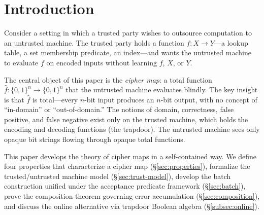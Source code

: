 \documentclass[11pt]{article}
\theoremstyle{definition}
\theoremstyle{plain}
\theoremstyle{remark}
\newcommand{\fhat}{\hat{f}}
\begin{document}
\section{Introduction}
\label{sec:intro}

Consider a setting in which a trusted party wishes to outsource computation
to an untrusted machine.  The trusted party holds a function
$f : X \to Y$---a lookup table, a set membership predicate, an index---and
wants the untrusted machine to evaluate $f$ on encoded inputs without
learning $f$, $X$, or $Y$.

The central object of this paper is the \emph{cipher map}: a total function
$\fhat : \{0,1\}^n \to \{0,1\}^n$ that the untrusted machine evaluates
blindly.  The key insight is that $\fhat$ is total---every $n$-bit input
produces an $n$-bit output, with no concept of ``in-domain'' or
``out-of-domain.''  The notions of domain, correctness, false positive, and
false negative exist only on the trusted machine, which holds the encoding
and decoding functions (the trapdoor).  The untrusted machine sees only
opaque bit strings flowing through opaque total functions.

This paper develops the theory of cipher maps in a self-contained way.
We define four properties that characterize a cipher map
(\S\ref{sec:properties}), formalize the trusted/untrusted machine model
(\S\ref{sec:trust-model}), develop the batch construction unified under the
acceptance predicate framework (\S\ref{sec:batch}), prove the composition
theorem governing error accumulation (\S\ref{sec:composition}), and discuss
the online alternative via trapdoor Boolean algebra
(\S\ref{subsec:online}).
\end{document}
